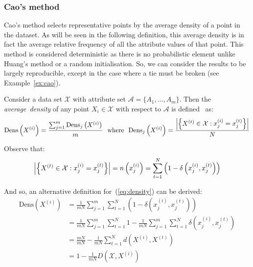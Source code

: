 
%

\subsubsection{Cao's method}\label{subsec:cao}

Cao's method selects representative points by the average density of a point in
the dataset. As will be seen in the following definition, this average density 
is in fact the average relative frequency of all the attribute values of that 
point. This method is considered deterministic as there is no probabilistic
element \- unlike Huang's method or a random initialisation. So, we can consider
the results to be largely reproducible, except in the case where a tie must be
broken (see Example~\ref{ex:cao}).

\begin{definition}\label{def:density}	
    Consider a data set \(\mathcal{X}\) with attribute set \(\mathcal{A} = 
    \{A_1, \ldots, A_m\}\). Then the \emph{average~density} of any point 
    \(X_i \in \mathcal{X}\) with respect to \(\mathcal{A}\) is 
    defined~\cite{Cao2009} as:
    \begin{equation}\label{eq:density}
        \text{Dens}\left(X^{(i)}\right) = \frac{%
            \sum_{j=1}^m \text{Dens}_{j}\left(X^{(i)}\right)
        }{m}
        \ \ \text{where} \ \
        \text{Dens}_{j}\left(X^{(i)}\right) = \frac{%
            \abs*{%
                \left\{X^{(t)} \in \mathcal{X} : x_j^{(i)} = x_j^{(t)}\right\}
            }
        }{N}
    \end{equation}

    Observe that:
    \[
        \abs*{\left\{X^{(t)} \in \mathcal{X} : x_j^{(i)} = x_j^{(t)}\right\}}%
        = n\left(x_j^{(i)}\right)%
        = \sum_{t=1}^N \left(1 - \delta\left(x_j^{(i)}, x_j^{(t)}\right)\right)
    \]

    And so, an alternative definition for~(\ref{eq:density}) can be derived:
    \begin{equation}\label{eq:density-alt}
    \begin{aligned}
        \text{Dens}\left(X^{(i)}\right)
        & = \frac{1}{mN} \sum_{j=1}^m \sum_{t=1}^N \left(%
            1 - \delta\left(x_j^{(i)}, x_j^{(t)}\right)
        \right)\\
        & = \frac{1}{mN} \sum_{j=1}^m \sum_{t=1}^N 1%
            - \frac{1}{mN} \sum_{j=1}^m \sum_{t=1}^N
            \delta\left(x_j^{(i)}, x_j^{(t)}\right)\\
        & = \frac{mN}{mN} - \frac{1}{mN} \sum_{t=1}^N
            d\left(X^{(i)}, X^{(t)}\right)\\
        & = 1 - \frac{1}{mN} D\left(\mathcal{X}, X^{(i)}\right)
    \end{aligned}
    \end{equation}
\end{definition}

